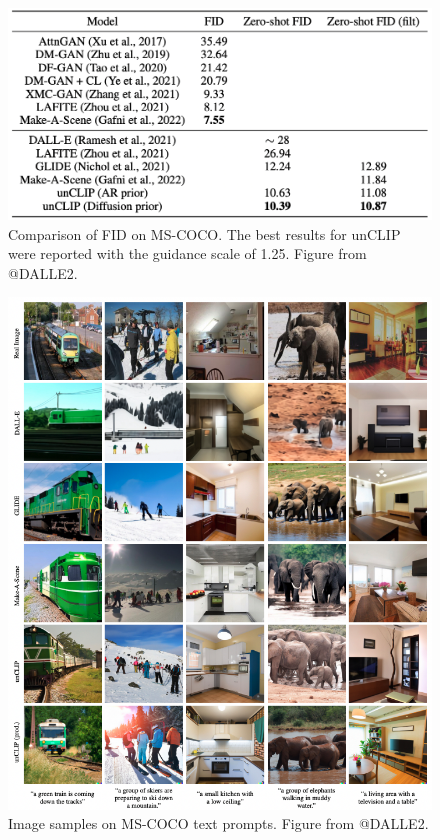 \documentclass[
]{krantz}
\begin{document}
\begin{figure}

{\centering \includegraphics[width=0.8\linewidth]{figures/02-02-text-2-img/uncliptable} 

}

\caption{Comparison of FID on MS-COCO. The best results for unCLIP were reported with the guidance scale of 1.25. Figure from @DALLE2.}\label{fig:uncliptable}
\end{figure}

\begin{figure}

{\centering \includegraphics[width=1\linewidth]{figures/02-02-text-2-img/unclipimages} 

}

\caption{Image samples on MS-COCO text prompts. Figure from @DALLE2.}\label{fig:unclipimages}
\end{figure}
\end{document}
